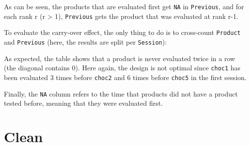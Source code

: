 \documentclass[
]{book}
\newenvironment{Shaded}{\begin{snugshade}}{\end{snugshade}}
\newcommand{\AttributeTok}[1]{\textcolor[rgb]{0.77,0.63,0.00}{#1}}
\newcommand{\DecValTok}[1]{\textcolor[rgb]{0.00,0.00,0.81}{#1}}
\newcommand{\FunctionTok}[1]{\textcolor[rgb]{0.00,0.00,0.00}{#1}}
\newcommand{\NormalTok}[1]{#1}
\newcommand{\SpecialCharTok}[1]{\textcolor[rgb]{0.00,0.00,0.00}{#1}}
\newcommand{\StringTok}[1]{\textcolor[rgb]{0.31,0.60,0.02}{#1}}
\begin{document}
As can be seen, the products that are evaluated first get \texttt{NA} in \texttt{Previous}, and for each rank r (r \textgreater{} 1), \texttt{Previous} gets the product that was evaluated at rank r-1.

To evaluate the carry-over effect, the only thing to do is to cross-count \texttt{Product} and \texttt{Previous} (here, the results are split per \texttt{Session}):

\begin{Shaded}
\end{Shaded}

As expected, the table shows that a product is never evaluated twice in a row (the diagonal contains 0). Here again, the design is not optimal since \texttt{choc1} has been evaluated 3 times before \texttt{choc2} and 6 times before \texttt{choc5} in the first session.

Finally, the \texttt{NA} column refers to the time that products did not have a product tested before, meaning that they were evaluated first.

\hypertarget{clean}{%
\section{Clean}\label{clean}}
\end{document}
